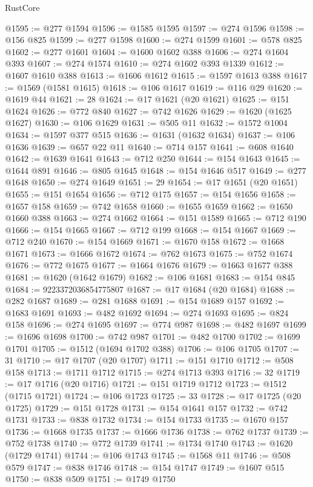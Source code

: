 \begin{lexlean}{RustCore}
\begin{coremodule}
@1595 := @277 @1594
@1596 := @1585 @1595
@1597 := @274 @1596
@1598 := @156 @825
@1599 := @277 @1598
@1600 := @274 @1599
@1601 := @578 @825
@1602 := @277 @1601
@1604 := @1600 @1602 @388
@1606 := @274 @1604 @393
@1607 := @274 @1574
@1610 := @274 @1602 @393 @1339
@1612 := @1607 @1610 @388
@1613 := @1606 @1612
@1615 := @1597 @1613 @388
@1617 := @1569 (@1581 @1615)
@1618 := @106 @1617
@1619 := @116 @29
@1620 := @1619 @44
@1621 := 28
@1624 := @17 @1621 (@20 @1621)
@1625 := @151 @1624
@1626 := @772 @840
@1627 := @742 @1626
@1629 := @1620 (@1625 @1627)
@1630 := @106 @1629
@1631 := @505 @11
@1632 := @1572 @1004
@1634 := @1597 @377 @515
@1636 := @1631 (@1632 @1634)
@1637 := @106 @1636
@1639 := @657 @22 @11
@1640 := @714 @157
@1641 := @608 @1640
@1642 := @1639 @1641
@1643 := @712 @250
@1644 := @154 @1643
@1645 := @1644 @891
@1646 := @805 @1645
@1648 := @154 @1646 @517
@1649 := @277 @1648
@1650 := @274 @1649
@1651 := 29
@1654 := @17 @1651 (@20 @1651)
@1655 := @151 @1654
@1656 := @712 @175
@1657 := @154 @1656
@1658 := @1657 @158
@1659 := @742 @1658
@1660 := @1655 @1659
@1662 := @1650 @1660 @388
@1663 := @274 @1662
@1664 := @151 @1589
@1665 := @712 @190
@1666 := @154 @1665
@1667 := @712 @199
@1668 := @154 @1667
@1669 := @712 @240
@1670 := @154 @1669
@1671 := @1670 @158
@1672 := @1668 @1671
@1673 := @1666 @1672
@1674 := @762 @1673
@1675 := @752 @1674
@1676 := @772 @1675
@1677 := @1664 @1676
@1679 := @1663 @1677 @388
@1681 := @1620 (@1642 @1679)
@1682 := @106 @1681
@1683 := @154 @845
@1684 := 9223372036854775807
@1687 := @17 @1684 (@20 @1684)
@1688 := @282 @1687
@1689 := @281 @1688
@1691 := @154 @1689 @157
@1692 := @1683 @1691
@1693 := @482 @1692
@1694 := @274 @1693
@1695 := @824 @158
@1696 := @274 @1695
@1697 := @774 @987
@1698 := @482 @1697
@1699 := @1696 @1698
@1700 := @742 @987
@1701 := @482 @1700
@1702 := @1699 @1701
@1705 := @1512 (@1694 @1702 @388)
@1706 := @106 @1705
@1707 := 31
@1710 := @17 @1707 (@20 @1707)
@1711 := @151 @1710
@1712 := @508 @158
@1713 := @1711 @1712
@1715 := @274 @1713 @393
@1716 := 32
@1719 := @17 @1716 (@20 @1716)
@1721 := @151 @1719 @1712
@1723 := @1512 (@1715 @1721)
@1724 := @106 @1723
@1725 := 33
@1728 := @17 @1725 (@20 @1725)
@1729 := @151 @1728
@1731 := @154 @1641 @157
@1732 := @742 @1731
@1733 := @838 @1732
@1734 := @154 @1733
@1735 := @1670 @157
@1736 := @1668 @1735
@1737 := @1666 @1736
@1738 := @762 @1737
@1739 := @752 @1738
@1740 := @772 @1739
@1741 := @1734 @1740
@1743 := @1620 (@1729 @1741)
@1744 := @106 @1743
@1745 := @1568 @11
@1746 := @508 @579
@1747 := @838 @1746
@1748 := @154 @1747
@1749 := @1607 @515
@1750 := @838 @509
@1751 := @1749 @1750

\end{coremodule}
\end{lexlean}
